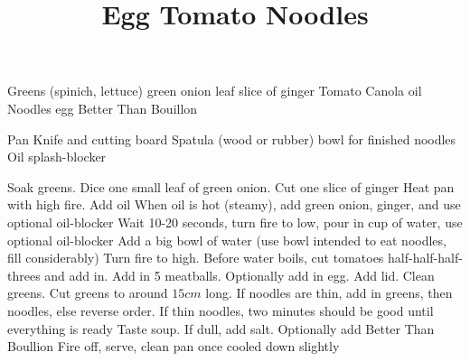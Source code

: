 \documentclass[10pt, twocolumn]{recipe}
\title{Egg Tomato Noodles\vspace{0em}}
\begin{document}
\maketitle
\begin{ingredients}
  \Item Greens (spinich, lettuce)
   green onion leaf
   slice of ginger
   Tomato
  \Item Canola oil
  \Item Noodles
  \Item {} egg
  \Item \Optional \Sauce Better Than Bouillon
\end{ingredients}

\begin{equipment}
  \Item Pan
  \Item Knife and cutting board
  \Item Spatula (wood or rubber)
   bowl for finished noodles
  \Item \Optional Oil splash-blocker
  \newpage
\end{equipment}

\begin{procedure}
\Step Soak greens. Dice one small leaf of green onion. Cut one slice of ginger
\Step Heat pan with high fire. Add oil
\Step When oil is hot (steamy), add green onion, ginger, and use optional oil-blocker
\Step Wait 10-20 seconds, turn fire to low, pour in cup of water, use optional oil-blocker
\Step Add a big bowl of water (use bowl intended to eat noodles, fill considerably)
\Step Turn fire to high. Before water boils, cut tomatoes half-half-half-threes and add in. Add in 5 meatballs. Optionally add in egg. Add lid.
\Step Clean greens. Cut greens to around $15cm$ long.
\Step If noodles are thin, add in greens, then noodles, else reverse order.
\Note If thin noodles, two minutes should be good until everything is ready
\Step Taste soup. If dull, add salt. Optionally add \Sauce Better Than Boullion
\Step Fire off, serve, clean pan once cooled down slightly

\end{procedure}
\end{document}
